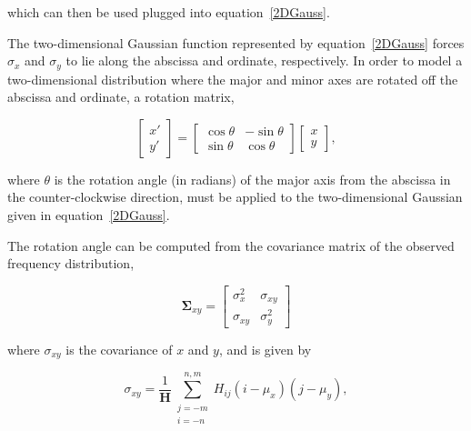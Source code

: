 \noindent which can then be used plugged into \mbox{equation \ref{2DGauss}}.

The two-dimensional Gaussian function represented by \mbox{equation \ref{2DGauss}} forces $\sigma_x$ and $\sigma_y$ to lie along the abscissa and ordinate, respectively.
In order to model a two-dimensional distribution where the major and minor axes are rotated off the abscissa and ordinate, a rotation matrix,

    \begin{equation}
        \label{RotationMatrix}
        \begin{bmatrix}
            x' \\ y'
        \end{bmatrix}
        =
        \begin{bmatrix}
            \cos{\theta} & -\sin{\theta} \\
            \sin{\theta} & \cos{\theta}
        \end{bmatrix}
        \begin{bmatrix}
            x \\ y
        \end{bmatrix},
    \end{equation}

\noindent where $\theta$ is the rotation angle (in radians) of the major axis from the abscissa in the counter-clockwise direction, must be applied to the two-dimensional Gaussian given in \mbox{equation \ref{2DGauss}}.


The rotation angle can be computed from the covariance matrix of the observed frequency distribution,

    \begin{equation}
        \label{CovMatrix}
        \boldsymbol{\Sigma}_{xy} =
        \begin{bmatrix}
            \sigma_x^2 & \sigma_{xy} \\
            \sigma_{xy} & \sigma_y^2
        \end{bmatrix}
    \end{equation}

\noindent where $\sigma_{xy}$ is the covariance of $x$ and $y$, and is given by

    \begin{equation}
        \label{sigmaxy}
        \sigma_{xy} = \frac{1}{\mathbf{H}} \sum\limits_{\substack{j=-m \\ i=-n}}^{n,m}H_{ij}(i - \mu_x)(j - \mu_y),
    \end{equation}

